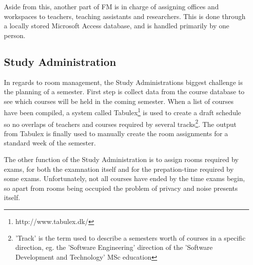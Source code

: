 Aside from this, another part of FM is in charge of assigning offices and workspaces to teachers, teaching assistants and researchers. This is done through a locally stored Microsoft Access database, and is handled primarily by one person.

\subsection{Study Administration}
In regards to room management, the Study Administrations biggest challenge is the planning of a semester. First step is collect data from the course database to see which courses will be held in the coming semester. When a list of courses have been compiled, a system called Tabulex\footnote{http://www.tabulex.dk/} is used to create a draft schedule so no overlaps of teachers and courses required by several tracks\footnote{'Track' is the term used to describe a semesters worth of courses in a specific direction, eg. the 'Software Engineering' direction of the 'Software Development and Technology' MSc education}. The output from Tabulex is finally used to manually create the room assignments for a standard week of the semester.

The other function of the Study Administration is to assign rooms required by exams, for both the examnation itself and for the prepation-time required by some exams. Unfortunately, not all courses have ended by the time exams begin, so apart from rooms being occupied the problem of privacy and noise presents itself.
\\
\label{sec:scope}
